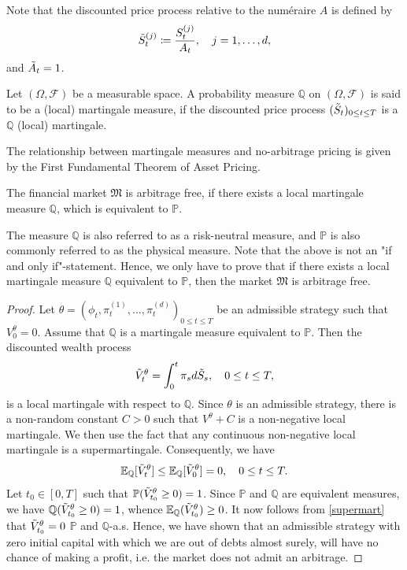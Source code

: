 Note that the discounted price process relative to the numéraire $A$ is defined by
\begin{equation}
    \Tilde{S}_{t}^{(j)}\coloneqq\frac{S_{t}^{(j)}}{A_{t}}, \quad j=1,\dots,d,
\end{equation}
and $\Tilde{A}_{t}=1$.
\begin{defn}
    Let $(\Omega, \mathcal{F})$ be a measurable space. A probability measure $\mathbb{Q}$ on $(\Omega,\mathcal{F})$ is said to be a (local) martingale measure, if the discounted price process $(\Tilde{S}_{t})_{0\leq t\leq T}$ is a $\mathbb{Q}$ (local) martingale.
\end{defn}
The relationship between martingale measures and no-arbitrage pricing is given by the First Fundamental Theorem of Asset Pricing.%
\begin{thm}
The financial market $\mathfrak{M}$ is arbitrage free, if there exists a local martingale measure $\mathbb{Q}$, which is equivalent to $\mathbb{P}$.
\end{thm}
The measure $\mathbb{Q}$ is also referred to as a risk-neutral measure, and $\mathbb{P}$ is also commonly referred to as the physical measure. Note that the above is not an "if and only if"-statement. Hence, we only have to prove that if there exists a local martingale measure $\mathbb{Q}$ equivalent to $\mathbb{P}$, then the market $\mathfrak{M}$ is arbitrage free.
\begin{proof} Let $\theta=(\phi_{t},\pi_{t}^{(1)},\dots,\pi_{t}^{(d)})_{0\leq t\leq T}$ be an admissible strategy such that $V_{0}^{\theta}=0$. Assume that $\mathbb{Q}$ is a martingale measure equivalent to $\mathbb{P}$. Then the discounted wealth process
\begin{equation}
    \Tilde{V}_{t}^{\theta}=\int_{0}^{t}\pi_{s}d\Tilde{S}_{s}, \quad 0\leq t\leq T,
\end{equation}
is a local martingale with respect to $\mathbb{Q}$. Since $\theta$ is an admissible strategy, there is a non-random constant $C>0$ such that $V^{\theta}+C$ is a non-negative local martingale. We then use the fact that any continuous non-negative local martingale is a supermartingale. Consequently, we have
\begin{equation}\label{supermart}
    \mathbb{E}_{\mathbb{Q}}[\Tilde{V}_{t}^{\theta}]\leq \mathbb{E}_{\mathbb{Q}}[\Tilde{V}_{0}^{\theta}]=0, \quad 0\leq t\leq T.
\end{equation}
Let $t_{0}\in [0,T]$ such that $\mathbb{P}(\Tilde{V}_{t_0}^{\theta}\geq 0)=1$. Since $\mathbb{P}$ and $\mathbb{Q}$ are equivalent measures, we have $\mathbb{Q}(\Tilde{V}_{t_0}^{\theta}\geq 0)=1$, whence $\mathbb{E}_{\mathbb{Q}}(\Tilde{V}_{t_{0}}^{\theta})\geq 0$. It now follows from \eqref{supermart} that $\Tilde{V}_{t_{0}}^{\theta}=0$ $\mathbb{P}$ and $\mathbb{Q}$-a.s. Hence, we have shown that an admissible strategy with zero initial capital with which we are out of debts almost surely, will have no chance of making a profit, i.e. the market does not admit an arbitrage.
\end{proof}
